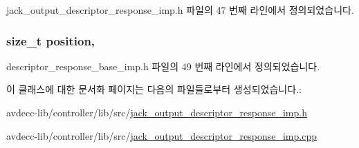 jack\+\_\+output\+\_\+descriptor\+\_\+response\+\_\+imp.\+h 파일의 47 번째 라인에서 정의되었습니다.

\subsubsection[{\texorpdfstring{position}{position}}]{\setlength{\rightskip}{0pt plus 5cm}size\+\_\+t position\hspace{0.3cm}{\ttfamily [protected]}, {\ttfamily [inherited]}}\hypertarget{classavdecc__lib_1_1descriptor__response__base__imp_a7a04afe5347934be732ec70a70bd0a28}{}\label{classavdecc__lib_1_1descriptor__response__base__imp_a7a04afe5347934be732ec70a70bd0a28}


descriptor\+\_\+response\+\_\+base\+\_\+imp.\+h 파일의 49 번째 라인에서 정의되었습니다.



이 클래스에 대한 문서화 페이지는 다음의 파일들로부터 생성되었습니다.\+:\begin{DoxyCompactItemize}
\item 
avdecc-\/lib/controller/lib/src/\hyperlink{jack__output__descriptor__response__imp_8h}{jack\+\_\+output\+\_\+descriptor\+\_\+response\+\_\+imp.\+h}\item 
avdecc-\/lib/controller/lib/src/\hyperlink{jack__output__descriptor__response__imp_8cpp}{jack\+\_\+output\+\_\+descriptor\+\_\+response\+\_\+imp.\+cpp}\end{DoxyCompactItemize}
